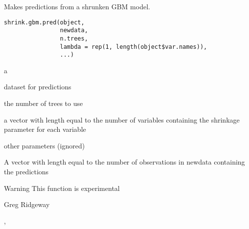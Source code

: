 \begin{Description}\relax
Makes predictions from a shrunken GBM model.
\end{Description}
\begin{Usage}
\begin{verbatim}
shrink.gbm.pred(object, 
                newdata, 
                n.trees, 
                lambda = rep(1, length(object$var.names)), 
                ...)
\end{verbatim}
\end{Usage}
\begin{Arguments}
\begin{ldescription}
\item[\code{object}] a  
\item[\code{newdata}] dataset for predictions 
\item[\code{n.trees}] the number of trees to use 
\item[\code{lambda}] a vector with length equal to the number of variables containing the shrinkage parameter for each variable 
\item[\code{...}] other parameters (ignored) 
\end{ldescription}
\end{Arguments}
\begin{Value}
A vector with length equal to the number of observations in newdata containing the predictions
\end{Value}
\begin{Section}{Warning}
This function is experimental
\end{Section}
\begin{Author}\relax
Greg Ridgeway 
\end{Author}
\begin{SeeAlso}\relax
{}, 
\end{SeeAlso}

